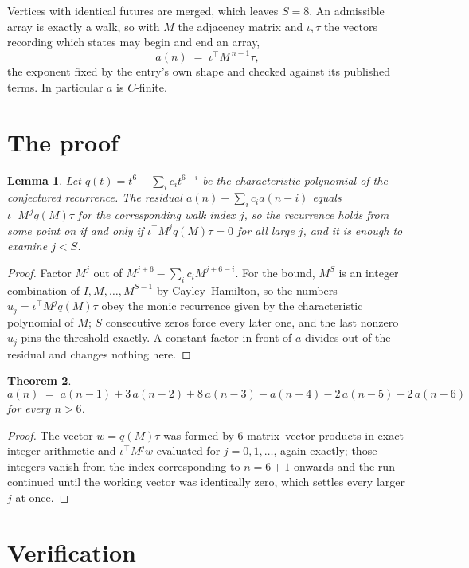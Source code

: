 \documentclass[11pt,a4paper]{article}
\theoremstyle{plain}
\newtheorem{theorem}{Theorem}
\newtheorem{lemma}[theorem]{Lemma}
\theoremstyle{definition}
\begin{document}
Vertices with identical futures are merged, which leaves $S=8$. An admissible array is exactly a walk, so with $M$ the adjacency matrix and $\iota,\tau$ the vectors recording which states may begin and end an array,
\[
a(n)\;=\;\iota^{\!\top}M^{\,n-1}\tau ,
\]
the exponent fixed by the entry's own shape and checked against its published terms. In
particular $a$ is $C$-finite.

\section{The proof}

\begin{lemma}\label{lem:crit}
Let $q(t)=t^{6}-\sum_i c_it^{6-i}$ be the characteristic polynomial of the
conjectured recurrence. The residual $a(n)-\sum_ic_ia(n-i)$ equals
$\iota^{\!\top}M^{\,j}q(M)\tau$ for the corresponding walk index $j$, so the recurrence
holds from some point on if and only if $\iota^{\!\top}M^{j}q(M)\tau=0$ for all large $j$,
and it is enough to examine $j<S$.
\end{lemma}

\begin{proof}
Factor $M^{j}$ out of $M^{j+6}-\sum_ic_iM^{j+6-i}$. For the bound, $M^{S}$
is an integer combination of $I,M,\dots,M^{S-1}$ by Cayley--Hamilton, so the numbers
$u_j=\iota^{\!\top}M^{j}q(M)\tau$ obey the monic recurrence given by the characteristic
polynomial of $M$; $S$ consecutive zeros force every later one, and the last nonzero $u_j$
pins the threshold exactly. A constant factor in front of $a$ divides out of the residual and
changes nothing here.
\end{proof}

\begin{theorem}
\[
a(n)\;=\;a(n-1) + 3\,a(n-2) + 8\,a(n-3) - a(n-4) - 2\,a(n-5) - 2\,a(n-6)
\]
for every $n>6$.
\end{theorem}

\begin{proof}
The vector $w=q(M)\tau$ was formed by $6$ matrix--vector products in exact integer
arithmetic and $\iota^{\!\top}M^{j}w$ evaluated for $j=0,1,\dots$, again exactly; those
integers vanish from the index corresponding to $n=6+1$ onwards and the run continued
until the working vector was identically zero, which settles every larger $j$ at once.
\end{proof}

\section{Verification}
\end{document}
